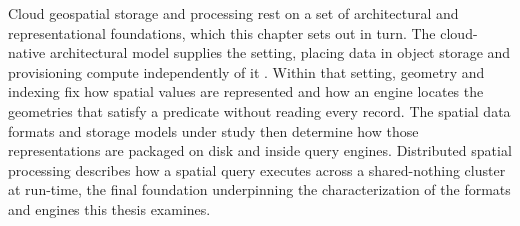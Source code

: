 Cloud geospatial storage and processing rest on a set of architectural and representational foundations, which this chapter sets out in turn. The cloud-native architectural model supplies the setting, placing data in object storage and provisioning compute independently of it \parencite{dageville2016_snowflake_elastic_data_warehouse, pang2024_storage_disaggregated_databases}. Within that setting, geometry and indexing fix how spatial values are represented and how an engine locates the geometries that satisfy a predicate without reading every record. The spatial data formats and storage models under study then determine how those representations are packaged on disk and inside query engines. Distributed spatial processing describes how a spatial query executes across a shared-nothing cluster at run-time, the final foundation underpinning the characterization of the formats and engines this thesis examines.





